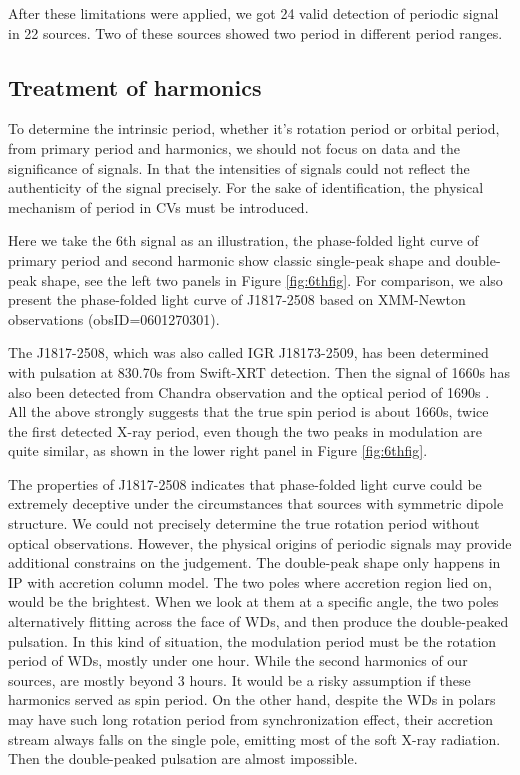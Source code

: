 \documentclass[twoside,twocolumn]{aastex63}
\begin{document}
After these limitations were applied, we got 24 valid detection of periodic signal in 22 sources. Two of these sources showed two period in different period ranges.
\subsection{Treatment of harmonics}\label{harmonics}

To determine the intrinsic period, whether it's rotation period or orbital period, from primary period and harmonics, we should not focus on data and the significance of signals. In that the intensities of signals could not reflect the authenticity of the signal precisely. For the sake of  identification, the physical mechanism of period in CVs must be introduced. 

Here we take the 6th signal as an illustration, the phase-folded light curve of primary period and second harmonic show classic  single-peak shape and double-peak shape, see the left two panels in Figure \ref{fig:6thfig}. For comparison, we also present the phase-folded light curve of J1817-2508 based on XMM-Newton observations (obsID=0601270301).

 The J1817-2508, which was also called IGR J18173-2509, has been determined with pulsation at 830.70s from Swift-XRT detection. Then the signal of 1660s has also been detected from Chandra observation \citep{2009ATel.2354....1N} and the optical period of 1690s \citep{2012A&A...542A..22B}. All the above strongly suggests that the true spin period is about 1660s, twice the first detected X-ray period, even though the two peaks in modulation are quite similar, as shown in the lower right panel in Figure \ref{fig:6thfig}.
 
 The properties of J1817-2508 indicates that phase-folded light curve could be extremely deceptive under the circumstances that sources with symmetric dipole structure. We could not precisely determine the true rotation period without optical observations. However, the physical origins of periodic signals may provide additional constrains on the judgement. The double-peak shape only happens in IP with accretion column model. The two poles where accretion region lied on, would be the brightest. When we look at them at a specific angle, the two poles alternatively flitting across the face of WDs, and then produce the double-peaked pulsation. In this kind of situation, the modulation period must be the rotation period of WDs, mostly under one hour. While the second harmonics of our sources, are mostly beyond 3 hours. It would be a risky assumption if these harmonics served as spin period. On the other hand, despite the WDs in polars may have such long rotation period from synchronization effect, their accretion stream always falls on the single pole, emitting most of the soft X-ray radiation. Then the double-peaked pulsation are almost impossible. 
 
\end{document}
